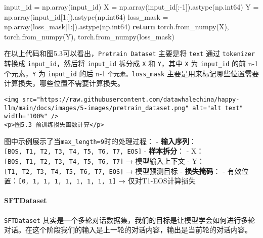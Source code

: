 \documentclass[
]{article}
\newenvironment{Shaded}{}{}
\newcommand{\ControlFlowTok}[1]{\textcolor[rgb]{0.00,0.44,0.13}{\textbf{#1}}}
\newcommand{\DecValTok}[1]{\textcolor[rgb]{0.25,0.63,0.44}{#1}}
\newcommand{\NormalTok}[1]{#1}
\newcommand{\OperatorTok}[1]{\textcolor[rgb]{0.40,0.40,0.40}{#1}}
\begin{document}
\begin{Shaded}
\begin{Highlighting}[]
\NormalTok{        input\_id }\OperatorTok{=}\NormalTok{ np.array(input\_id)}
\NormalTok{        X }\OperatorTok{=}\NormalTok{ np.array(input\_id[:}\OperatorTok{{-}}\DecValTok{1}\NormalTok{]).astype(np.int64)}
\NormalTok{        Y }\OperatorTok{=}\NormalTok{ np.array(input\_id[}\DecValTok{1}\NormalTok{:]).astype(np.int64)}
\NormalTok{        loss\_mask }\OperatorTok{=}\NormalTok{ np.array(loss\_mask[}\DecValTok{1}\NormalTok{:]).astype(np.int64)}
        \ControlFlowTok{return}\NormalTok{ torch.from\_numpy(X), torch.from\_numpy(Y), torch.from\_numpy(loss\_mask)}
\end{Highlighting}
\end{Shaded}

在以上代码和图5.3可以看出，\texttt{Pretrain\ Dataset} 主要是将
\texttt{text} 通过 \texttt{tokenizer} 转换成 \texttt{input\_id}，然后将
\texttt{input\_id} 拆分成 \texttt{X} 和 \texttt{Y}，其中 \texttt{X} 为
\texttt{input\_id} 的前 n-1 个元素，\texttt{Y} 为 \texttt{input\_id}
的后 n-1 \texttt{个元素。loss\_mask}
主要是用来标记哪些位置需要计算损失，哪些位置不需要计算损失。

\begin{verbatim}
<img src="https://raw.githubusercontent.com/datawhalechina/happy-llm/main/docs/images/5-images/pretrain_dataset.png" alt="alt text" width="100%" />
<p>图5.3 预训练损失函数计算</p>
\end{verbatim}

图中示例展示了当\texttt{max\_length=9}时的处理过程： -
\textbf{输入序列}：\texttt{{[}BOS,\ T1,\ T2,\ T3,\ T4,\ T5,\ T6,\ T7,\ EOS{]}}
- \textbf{样本拆分}： -
X：\texttt{{[}BOS,\ T1,\ T2,\ T3,\ T4,\ T5,\ T6,\ T7{]}} →
模型输入上下文 -
Y：\texttt{{[}T1,\ T2,\ T3,\ T4,\ T5,\ T6,\ T7,\ EOS{]}} → 模型预测目标
- \textbf{损失掩码}： -
有效位置：\texttt{{[}0,\ 1,\ 1,\ 1,\ 1,\ 1,\ 1,\ 1,\ 1{]}} →
仅对T1-EOS计算损失

\paragraph{SFTDataset}\label{sftdataset}

\texttt{SFTDataset}
其实是一个多轮对话数据集，我们的目标是让模型学会如何进行多轮对话。在这个阶段我们的输入是上一轮的对话内容，输出是当前轮的对话内容。
\end{document}
